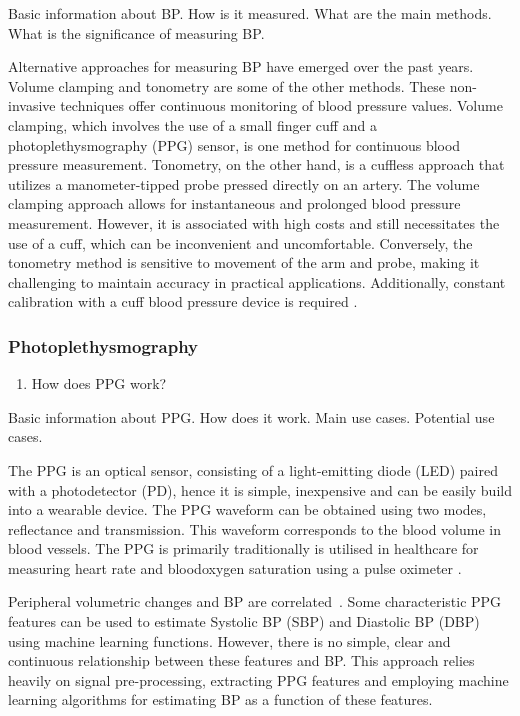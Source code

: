 \documentclass[10pt, bibliography=totoc]{scrartcl}
\begin{document}
Basic information about BP. How is it measured. What are the main methods. What is the significance of measuring BP. \cite{WhatBloodPressure2019}

Alternative approaches for measuring BP have emerged over the past years.
Volume clamping \cite{kimBallistocardiogramBasedApproachCuffless2018} and tonometry \cite{imholzFifteenYearsExperience1998} are some of the other methods. These non-invasive techniques offer continuous monitoring of blood pressure values. 
Volume clamping, which involves the use of a small finger cuff and a photoplethysmography (PPG) sensor, is one method for continuous blood pressure measurement. Tonometry, on the other hand, is a cuffless approach that utilizes a manometer-tipped probe pressed directly on an artery.
The volume clamping approach allows for instantaneous and prolonged blood pressure measurement. However, it is associated with high costs and still necessitates the use of a cuff, which can be inconvenient and uncomfortable. Conversely, the tonometry method is sensitive to movement of the arm and probe, making it challenging to maintain accuracy in practical applications. Additionally, constant calibration with a cuff blood pressure device is required \cite{peterReviewMethodsNoninvasive2014}.

\subsubsection{Photoplethysmography}

\begin{enumerate}
\item How does PPG work?
\end{enumerate}

Basic information about PPG. How does it work. Main use cases. Potential use cases.

The PPG is an optical sensor, consisting of a light-emitting diode (LED) paired with a photodetector (PD), hence it is simple, inexpensive and can be easily build into a wearable device. The PPG waveform can be obtained using two modes, reflectance and transmission. This waveform corresponds to the blood volume in blood vessels. The PPG is primarily traditionally is utilised in healthcare for measuring heart rate and bloodoxygen saturation using a pulse oximeter \cite{allenPhotoplethysmographyItsApplication2007}.

Peripheral volumetric changes and BP are correlated~\cite{langewoutersPressurediameterRelationshipsSegments1986}.
Some characteristic PPG features can be used to estimate Systolic BP (SBP) and Diastolic BP (DBP) using machine learning functions. However, there is no simple, clear and continuous relationship between these features and BP. This approach relies heavily on signal pre-processing, extracting PPG features and employing machine learning algorithms for estimating BP as a function of these features.
\end{document}
